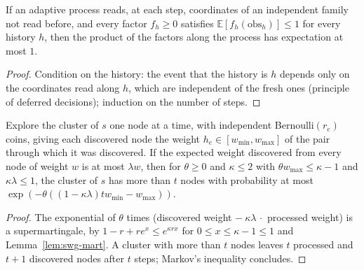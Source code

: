 \begin{lemma}\label{lem:swg-mart}
\leanok
If an adaptive process reads, at each step, coordinates of an independent family not read before,
and every factor $f_h \ge 0$ satisfies $\mathbb E[f_h(\mathrm{obs}_h)] \le 1$ for every history $h$,
then the product of the factors along the process has expectation at most $1$.
\end{lemma}
\begin{proof}\leanok
Condition on the history: the event that the history is $h$ depends only on the coordinates read
along $h$, which are independent of the fresh ones (principle of deferred decisions); induction on
the number of steps.
\end{proof}

\begin{theorem}\label{thm:swg-explore}
\leanok{}
Explore the cluster of $s$ one node at a time, with independent Bernoulli$(r_e)$ coins, giving
each discovered node the weight $h_e \in [w_{\min}, w_{\max}]$ of the pair through which it was
discovered. If the expected weight discovered from every node of weight $w$ is at most $\lambda w$,
then for $\theta \ge 0$ and $\kappa \le 2$ with $\theta w_{\max} \le \kappa - 1$ and $\kappa\lambda
\le 1$, the cluster of $s$ has more than $t$ nodes with probability at most
$\exp(-\theta((1-\kappa\lambda) t w_{\min} - w_{\max}))$.
\end{theorem}
\begin{proof}\leanok
The exponential of $\theta$ times (discovered weight $-\ \kappa\lambda\,\cdot$ processed weight) is
a supermartingale, by $1 - r + r e^x \le e^{\kappa r x}$ for $0 \le x \le \kappa - 1 \le 1$ and
Lemma~\ref{lem:swg-mart}. A cluster with more than $t$ nodes leaves $t$ processed and $t + 1$
discovered nodes after $t$ steps; Markov's inequality concludes.
\end{proof}


